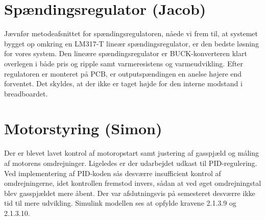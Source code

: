 \section{Spændingsregulator (Jacob)}
\label{sec:spandingsregulator}


Jævnfør metodeafsnittet for spændingsregulatoren, nåede vi frem til, at systemet bygget op omkring en LM317-T lineær spændingsregulator, er den bedste løsning for vores system. Den lineære spændingsregulator er BUCK-konverteren klart overlegen i både pris og ripple samt varmeresistens og varmeudvikling. Efter regulatoren er monteret på PCB, er outputspændingen en anelse højere end forventet. Det skyldes, at der ikke er taget højde for den interne modstand i breadboardet. 

\section{Motorstyring (Simon)}
\label{sec:motorstyring-2} 

Der er blevet lavet kontrol af motoropstart samt justering af gasspjæld og måling af motorens omdrejninger. Ligeledes er der udarbejdet udkast til PID-regulering. Ved implementering af PID-koden sås desværre insufficient kontrol af omdrejningerne, idet kontrollen fremstod invers, sådan at ved øget omdrejningstal blev gasspjældet mere åbent. Der var afslutningsvis på semesteret desværre ikke tid til mere udvikling. Simulink modellen ses at opfylde kravene 2.1.3.9 og 2.1.3.10.


% 

\clearpage


% 

% 

% 

% 


